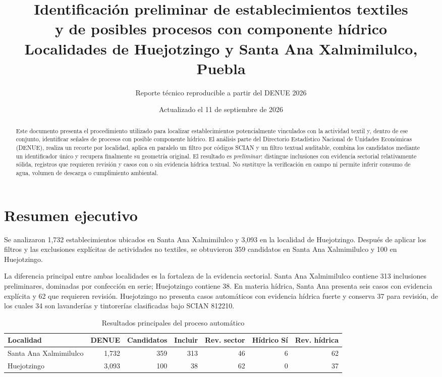 \documentclass[11pt,letterpaper]{article}
\title{\textbf{Identificación preliminar de establecimientos textiles\\
y de posibles procesos con componente hídrico}\\[0.5em]
\large Localidades de Huejotzingo y Santa Ana Xalmimilulco, Puebla}
\author{Reporte técnico reproducible a partir del DENUE 2026}
\date{Actualizado el 11 de septiembre de 2026}
\begin{document}
\maketitle

\begin{abstract}
Este documento presenta el procedimiento utilizado para localizar establecimientos potencialmente vinculados con la actividad textil y, dentro de ese conjunto, identificar señales de procesos con posible componente hídrico. El análisis parte del Directorio Estadístico Nacional de Unidades Económicas (DENUE), realiza un recorte por localidad, aplica en paralelo un filtro por códigos SCIAN y un filtro textual auditable, combina los candidatos mediante un identificador único y recupera finalmente su geometría original. El resultado es \emph{preliminar}: distingue inclusiones con evidencia sectorial relativamente sólida, registros que requieren revisión y casos con o sin evidencia hídrica textual. No sustituye la verificación en campo ni permite inferir consumo de agua, volumen de descarga o cumplimiento ambiental.
\end{abstract}

\tableofcontents
\newpage

\section{Resumen ejecutivo}

Se analizaron 1,732 establecimientos ubicados en Santa Ana Xalmimilulco y 3,093 en la localidad de Huejotzingo. Después de aplicar los filtros y las exclusiones explícitas de actividades no textiles, se obtuvieron 359 candidatos en Santa Ana Xalmimilulco y 100 en Huejotzingo.

La diferencia principal entre ambas localidades es la fortaleza de la evidencia sectorial. Santa Ana Xalmimilulco contiene 313 inclusiones preliminares, dominadas por confección en serie; Huejotzingo contiene 38. En materia hídrica, Santa Ana presenta seis casos con evidencia explícita y 62 que requieren revisión. Huejotzingo no presenta casos automáticos con evidencia hídrica fuerte y conserva 37 para revisión, de los cuales 34 son lavanderías y tintorerías clasificadas bajo SCIAN 812210.

\begin{table}[H]
\centering
\caption{Resultados principales del proceso automático}
\begin{tabular}{lrrrrrr}
\toprule
Localidad & DENUE & Candidatos & Incluir & Rev. sector & Hídrico Sí & Rev. hídrica\\
\midrule
Santa Ana Xalmimilulco & 1,732 & 359 & 313 & 46 & 6 & 62\\
Huejotzingo             & 3,093 & 100 & 38  & 62 & 0 & 37\\
\bottomrule
\end{tabular}
\end{table}
\end{document}
